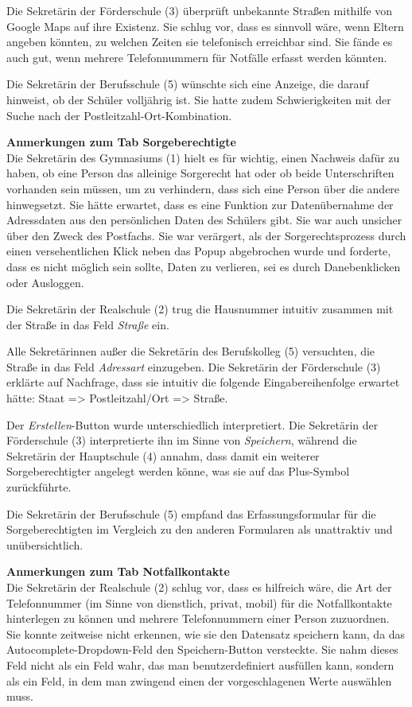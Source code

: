 Die Sekretärin der Förderschule (3) überprüft unbekannte Straßen mithilfe von Google Maps auf ihre Existenz. Sie schlug vor, dass es sinnvoll wäre, wenn Eltern angeben könnten, zu welchen Zeiten sie telefonisch erreichbar sind. Sie fände es auch gut, wenn mehrere Telefonnummern für Notfälle erfasst werden könnten.

Die Sekretärin der Berufsschule (5) wünschte sich eine Anzeige, die darauf hinweist, ob der Schüler volljährig ist. Sie hatte zudem Schwierigkeiten mit der Suche nach der Postleitzahl-Ort-Kombination.

\textbf{Anmerkungen zum Tab \glqq Sorgeberechtigte\grqq{}}\\
Die Sekretärin des Gymnasiums (1) hielt es für wichtig, einen Nachweis dafür zu haben, ob eine Person das alleinige Sorgerecht hat oder ob beide Unterschriften vorhanden sein müssen, um zu verhindern, dass sich eine Person über die andere hinwegsetzt. Sie hätte erwartet, dass es eine Funktion zur Datenübernahme der Adressdaten aus den persönlichen Daten des Schülers gibt. Sie war auch unsicher über den Zweck des Postfachs. Sie war verärgert, als der Sorgerechtsprozess durch einen versehentlichen Klick neben das Popup abgebrochen wurde und forderte, dass es nicht möglich sein sollte, Daten zu verlieren, sei es durch Danebenklicken oder Ausloggen.

Die Sekretärin der Realschule (2) trug die Hausnummer intuitiv zusammen mit der Straße in das Feld \textit{Straße} ein.

Alle Sekretärinnen außer die Sekretärin des Berufskolleg (5) versuchten, die Straße in das Feld \textit{Adressart} einzugeben. Die Sekretärin der Förderschule (3) erklärte auf Nachfrage, dass sie intuitiv die folgende Eingabereihenfolge erwartet hätte: Staat => Postleitzahl/Ort => Straße.

Der \textit{Erstellen}-Button wurde unterschiedlich interpretiert. Die Sekretärin der Förderschule (3) interpretierte ihn im Sinne von \textit{Speichern}, während die Sekretärin der Hauptschule (4) annahm, dass damit ein weiterer Sorgeberechtigter angelegt werden könne, was sie auf das Plus-Symbol zurückführte.

Die Sekretärin der Berufsschule (5) empfand das Erfassungsformular für die Sorgeberechtigten im Vergleich zu den anderen Formularen als \glqq unattraktiv\grqq{} und \glqq unübersichtlich\grqq{}.

\textbf{Anmerkungen zum Tab \glqq Notfallkontakte\grqq{}}\\
Die Sekretärin der Realschule (2) schlug vor, dass es hilfreich wäre, die Art der Telefonnummer (im Sinne von dienstlich, privat, mobil) für die Notfallkontakte hinterlegen zu können und mehrere Telefonnummern einer Person zuzuordnen. Sie konnte zeitweise nicht erkennen, wie sie den Datensatz speichern kann, da das Autocomplete-Dropdown-Feld den Speichern-Button versteckte. Sie nahm dieses Feld nicht als ein Feld wahr, das man benutzerdefiniert ausfüllen kann, sondern als ein Feld, in dem man zwingend einen der vorgeschlagenen Werte auswählen muss.

